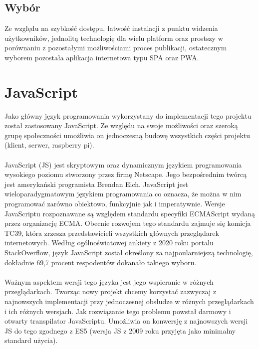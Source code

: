 \subsection{Wybór}
Ze względu na szybkość dostępu, łatwość instalacji z punktu widzenia użytkowników, jednolitą technologię dla wielu platform oraz prostszy w porównaniu z pozostałymi możliwościami proces publikacji, ostatecznym wyborem pozostała aplikacja internetowa typu SPA oraz PWA.

\section{JavaScript}

Jako główny język programowania wykorzystany do implementacji tego projektu został zastosowany JavaScript. Ze względu na swoje możliwości oraz szeroką grupę społeczności umożliwia on jednoczesną budowę wszystkich części projektu (klient, serwer, raspberry pi).
\\\\
JavaScript (JS) jest skryptowym oraz dynamicznym językiem programowania wysokiego poziomu stworzony przez firmę Netscape. Jego bezpośrednim twórcą jest amerykański programista Brendan Eich. JavaScript jest wieloparadygmatowym językiem programowania co oznacza, że można w nim programować zarówno obiektowo, funkcyjnie jak i imperatywnie. Wersje JavaScriptu rozpoznawane są względem standardu specyfiki ECMAScript wydaną przez organizację ECMA. Obecnie rozwojem tego standardu zajmuje się komicja TC39, która zrzesza przedstawicieli wszystkich głównych przeglądarek internetowych. Według ogólnoświatowej ankiety z 2020 roku portalu StackOverflow, język JavaScript został określony za najpoularniejszą technologię, dokładnie 69,7 procent respodentów dokanało takiego wyboru. 
\\\\
Ważnym aspektem wersji tego języka jest jego wspieranie w różnych przeglądarkach. Tworząc nowy projekt chcemy korzystać zazwyczaj z najnowszych implementacji przy jednoczesnej obsłudze w różnych przeglądarkach i ich różnych wersjach. Jak rozwiązanie tego problemu powstał darmowy i otwarty transpilator JavaScriptu. Umożliwia on konwersję z najnowszych wersji JS do tego zgodnego z ES5 (wersja JS z 2009 roku przyjęta jako minimalny standard użycia).


